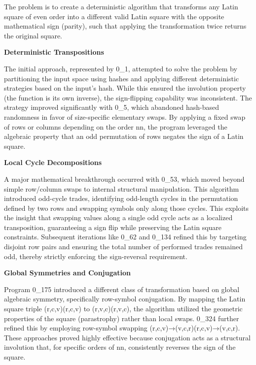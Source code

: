 \documentclass[11pt]{amsart}
\begin{document}
\begin{tcolorbox}[
  enhanced,
  breakable,
  title={Gemini-generated summary},
  colback=gray!3,
  colframe=black!30,
  title after break={Gemini-generated summary (continued)}
]
The problem is to create a deterministic algorithm that transforms any Latin square of even order into a different valid Latin square with the opposite mathematical sign (parity), such that applying the transformation twice returns the original square.

\noindent \textbf{Deterministic Transpositions}

The initial approach, represented by 0\_1, attempted to solve the problem by partitioning the input space using hashes and applying different deterministic strategies based on the input's hash. While this ensured the involution property (the function is its own inverse), the sign-flipping capability was inconsistent. The strategy improved significantly with 0\_5, which abandoned hash-based randomness in favor of size-specific elementary swaps. By applying a fixed swap of rows or columns depending on the order nn, the program leveraged the algebraic property that an odd permutation of rows negates the sign of a Latin square.

\noindent \textbf{Local Cycle Decompositions}

A major mathematical breakthrough occurred with 0\_53, which moved beyond simple row/column swaps to internal structural manipulation. This algorithm introduced odd-cycle trades, identifying odd-length cycles in the permutation defined by two rows and swapping symbols only along those cycles. This exploits the insight that swapping values along a single odd cycle acts as a localized transposition, guaranteeing a sign flip while preserving the Latin square constraints. Subsequent iterations like 0\_62 and 0\_134 refined this by targeting disjoint row pairs and ensuring the total number of performed trades remained odd, thereby strictly enforcing the sign-reversal requirement.

\noindent \textbf{Global Symmetries and Conjugation}

Program 0\_175 introduced a different class of transformation based on global algebraic symmetry, specifically row-symbol conjugation. By mapping the Latin square triple (r,c,v)(r,c,v) to (r,v,c)(r,v,c), the algorithm utilized the geometric properties of the square (parastrophy) rather than local swaps. 0\_324 further refined this by employing row-symbol swapping (r,c,v)→(v,c,r)(r,c,v)→(v,c,r). These approaches proved highly effective because conjugation acts as a structural involution that, for specific orders of nn, consistently reverses the sign of the square.


\end{tcolorbox}
\end{document}
